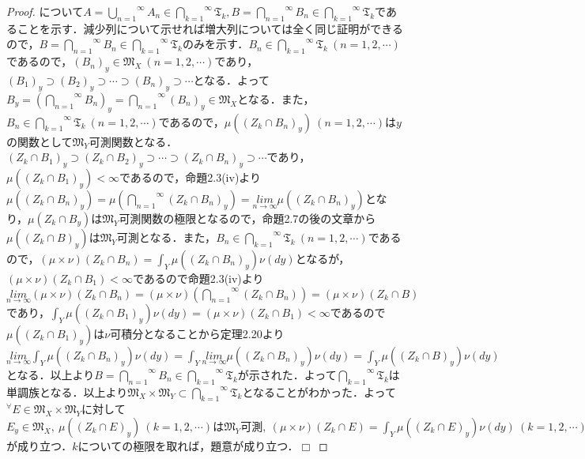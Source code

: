 \documentclass[a4paper,11pt]{jsarticle}
\newtheorem{proof}{証明}
\def\qed{\hfill $\Box$}
\begin{document}
\begin{proof}
について$A=\overset{\infty}{\underset{n=1}{\bigcup}}A_n\in\overset{\infty}{\underset{k=1}{\bigcap}}\mathfrak{T}_k,B=\overset{\infty}{\underset{n=1}{\bigcap}}B_n\in\overset{\infty}{\underset{k=1}{\bigcap}}\mathfrak{T}_k$であることを示す．減少列について示せれば増大列については全く同じ証明ができるので，$B=\overset{\infty}{\underset{n=1}{\bigcap}}B_n\in\overset{\infty}{\underset{k=1}{\bigcap}}\mathfrak{T}_k$のみを示す．$B_n\in\overset{\infty}{\underset{k=1}{\bigcap}}\mathfrak{T}_k{\ }(n=1,2,\cdots)$であるので，$(B_n)_y\in \mathfrak{M}_X{\ }(n=1,2,\cdots)$であり，$(B_1)_y\supset (B_2)_y\supset \cdots\supset (B_n)_y\supset \cdots$となる．よって$B_y=\left(\overset{\infty}{\underset{n=1}{\bigcap}}B_n\right)_y=\overset{\infty}{\underset{n=1}{\bigcap}}(B_n)_y\in\mathfrak{M}_X$となる．また，$B_n\in\overset{\infty}{\underset{k=1}{\bigcap}}\mathfrak{T}_k{\ }(n=1,2,\cdots)$であるので，$\mu((Z_k\cap B_n)_y){\ }(n=1,2,\cdots)$は$y$の関数として$\mathfrak{M}_Y$可測関数となる．$(Z_k\cap B_1)_y\supset (Z_k\cap B_2)_y\supset \cdots\supset (Z_k\cap B_n)_y\supset \cdots$であり，$\mu((Z_k\cap B_1)_y)<\infty$であるので，命題2.3(iv)より$\mu((Z_k\cap B_n)_y)=\mu(\overset{\infty}{\underset{n=1}{\bigcap}}(Z_k\cap B_n)_y)=\underset{n\to \infty}{lim}\mu((Z_k\cap B_n)_y)$となり，$\mu(Z_k\cap B_y)$は$\mathfrak{M}_Y$可測関数の極限となるので，命題2.7の後の文章から$\mu((Z_k\cap B)_y)$は$\mathfrak{M}_Y$可測となる．また，$B_n\in\overset{\infty}{\underset{k=1}{\bigcap}}\mathfrak{T}_k{\ }(n=1,2,\cdots)$であるので，$(\mu\times\nu)(Z_k\cap B_n)=\int_Y\mu((Z_k\cap B_n)_y)\nu(dy)$となるが，$(\mu\times\nu)(Z_k\cap B_1)<\infty$であるので命題2.3(iv)より$\underset{n\to \infty}{lim}(\mu\times\nu)(Z_k\cap B_n)=(\mu\times\nu)(\overset{\infty}{\underset{n=1}{\bigcap}}(Z_k\cap B_n))=(\mu\times\nu)(Z_k\cap B)$であり，$\int_Y\mu((Z_k\cap B_1)_y)\nu(dy)=(\mu\times\nu)(Z_k\cap B_1)<\infty$であるので$\mu((Z_k\cap B_1)_y)$は$\nu$可積分となることから定理2.20より$\underset{n\to \infty}{lim}\int_Y\mu((Z_k\cap B_n)_y)\nu(dy)=\int_Y\underset{n\to \infty}{lim}\mu((Z_k\cap B_n)_y)\nu(dy)=\int_Y\mu((Z_k\cap B)_y)\nu(dy)$となる．以上より$B=\overset{\infty}{\underset{n=1}{\bigcap}}B_n\in\overset{\infty}{\underset{k=1}{\bigcap}}\mathfrak{T}_k$が示された．よって$\overset{\infty}{\underset{k=1}{\bigcap}}\mathfrak{T}_k$は単調族となる．以上より$\mathfrak{M}_X\times\mathfrak{M}_Y \subset \overset{\infty}{\underset{k=1}{\bigcap}}\mathfrak{T}_k$となることがわかった．よって$^\forall E\in \mathfrak{M}_X\times\mathfrak{M}_Y$に対して$E_y\in \mathfrak{M}_X,{\ }\mu((Z_k\cap E)_y){\ }(k=1,2,\cdots) は \mathfrak{M}_Y 可測 ,{\ }(\mu\times\nu)(Z_k\cap E)=\int_Y\mu((Z_k\cap E)_y)\nu(dy){\ }(k=1,2,\cdots)$が成り立つ．$k$についての極限を取れば，題意が成り立つ．\qed
\end{proof}
\end{document}
